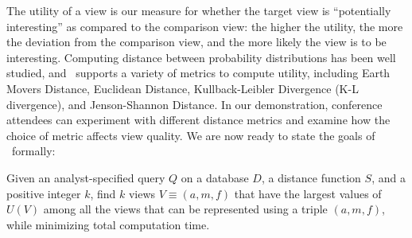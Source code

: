 The utility of a view is our measure for whether the target view is
``potentially interesting'' as compared to the comparison view:
the higher the utility, the more the deviation
from the comparison view, and the more likely the view is to be interesting.
Computing distance between probability distributions has
been well studied, and \SeeDB\ supports a variety of metrics
to compute utility, including Earth Movers Distance, 
Euclidean Distance, Kullback-Leibler Divergence (K-L
divergence), and Jenson-Shannon
Distance. 
In our demonstration, conference attendees can experiment with
different distance metrics and examine how the choice of metric affects view
quality.
We are now ready to state the goals of \SeeDB\ formally:
\begin{problem}
\vspace{-5pt}
Given an analyst-specified query $Q$ on a database $D$, a distance function $S$,
and a positive integer $k$, find $k$ views $V \equiv (a, m, f)$ that
have the largest values of $U(V)$ among all the views that can be represented
using a triple $(a, m, f)$, while minimizing total computation time.
\vspace{-5pt}
\end{problem}

